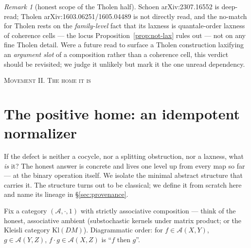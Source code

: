 \documentclass[11pt]{amsart}
\theoremstyle{plain}
\theoremstyle{definition}
\theoremstyle{remark}
\newtheorem{remark}[theorem]{Remark}
\newcommand{\Kl}{\mathrm{Kl}}
\begin{document}
\begin{remark}[honest scope of the Tholen half]
\label{rem:tholen}
Schoen arXiv:2307.16552 is deep-read; Tholen arXiv:1603.06251/1605.04489 is not directly read, and
the no-match for Tholen rests on the \emph{family-level} fact that its laxness is quantale-order
laxness of coherence cells --- the locus Proposition~\ref{prop:not-lax} rules out --- not on any fine
Tholen detail. Were a future read to surface a Tholen construction laxifying an \emph{argument slot}
of a composition rather than a coherence cell, this verdict should be revisited; we judge it unlikely
but mark it the one unread dependency.
\end{remark}

\bigskip
\begin{center}\textsc{Movement II. The home it is}\end{center}

\section{The positive home: an idempotent normalizer}
\label{sec:home}

If the defect is neither a cocycle, nor a splitting obstruction, nor a laxness, what \emph{is} it?
The honest answer is concrete and lives one level up from every map so far --- at the binary
operation itself. We isolate the minimal abstract structure that carries it. The structure turns out
to be classical; we define it from scratch here and name its lineage in \S\ref{sec:provenance}.

Fix a category $(\mathcal{A},\cdot,1)$ with strictly associative composition --- think of the
honest, associative ambient (substochastic kernels under matrix product; or the Kleisli category
$\Kl(DM)$). Diagrammatic order: for $f\in\mathcal{A}(X,Y)$, $g\in\mathcal{A}(Y,Z)$, $f\cdot g\in
\mathcal{A}(X,Z)$ is ``$f$ then $g$''.
\end{document}
